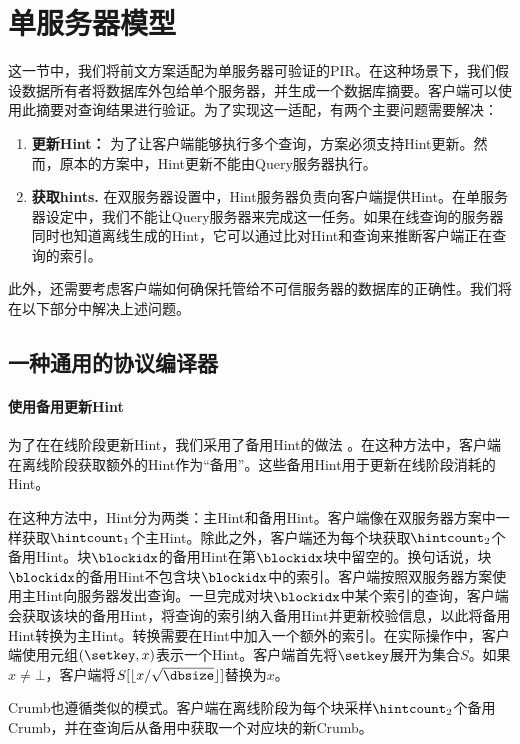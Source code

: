 \section{单服务器模型}
这一节中，我们将前文方案适配为单服务器可验证的PIR。在这种场景下，我们假设数据所有者将数据库外包给单个服务器，并生成一个数据库摘要。客户端可以使用此摘要对查询结果进行验证。为了实现这一适配，有两个主要问题需要解决：
\begin{enumerate}
    \item \textbf{更新Hint：} 为了让客户端能够执行多个查询，方案必须支持Hint更新。然而，原本的方案中，Hint更新不能由Query服务器执行。
    \item \textbf{获取hints.} 在双服务器设置中，Hint服务器负责向客户端提供Hint。在单服务器设定中，我们不能让Query服务器来完成这一任务。如果在线查询的服务器同时也知道离线生成的Hint，它可以通过比对Hint和查询来推断客户端正在查询的索引。
\end{enumerate}

此外，还需要考虑客户端如何确保托管给不可信服务器的数据库的正确性。我们将在以下部分中解决上述问题。

\subsection{一种通用的协议编译器}

\paragraph{使用备用更新Hint}
为了在在线阶段更新Hint，我们采用了备用Hint的做法 \cite{EC:CorHenKog22}。在这种方法中，客户端在离线阶段获取额外的Hint作为“备用”。这些备用Hint用于更新在线阶段消耗的Hint。

在这种方法中，Hint分为两类：主Hint和备用Hint。客户端像在双服务器方案中一样获取$\hintcount_1$个主Hint。除此之外，客户端还为每个块获取$\hintcount_2$个备用Hint。块$\blockidx$的备用Hint在第$\blockidx$块中留空的。换句话说，块$\blockidx$的备用Hint不包含块$\blockidx$中的索引。客户端按照双服务器方案使用主Hint向服务器发出查询。一旦完成对块$\blockidx$中某个索引的查询，客户端会获取该块的备用Hint，将查询的索引纳入备用Hint并更新校验信息，以此将备用Hint转换为主Hint。转换需要在Hint中加入一个额外的索引。在实际操作中，客户端使用元组$(\setkey, x)$表示一个Hint。客户端首先将$\setkey$展开为集合$S$。如果$x\neq \bot$，客户端将$S[\lfloor x/\sqrt{\dbsize}\rfloor]$替换为$x$。

Crumb也遵循类似的模式。客户端在离线阶段为每个块采样$\hintcount_2$个备用Crumb，并在查询后从备用中获取一个对应块的新Crumb。

